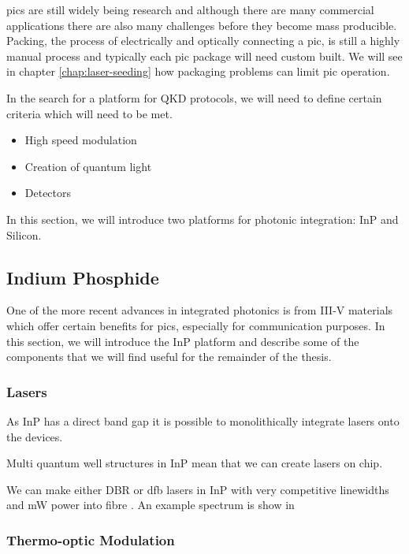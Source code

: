 \Acp{pic} are still widely being research and although there are many commercial applications there are also many challenges before they become mass producible. Packing, the process of electrically and optically connecting a \ac{pic}, is still a highly manual process and typically each \ac{pic} package will need custom built. We will see in chapter \ref{chap:laser-seeding} how packaging problems can limit \ac{pic} operation.

In the search for a platform for \ac{QKD} protocols, we will need to define certain criteria which will need to be met.

\begin{itemize}
	\item High speed modulation
	\item Creation of quantum light
	\item Detectors
\end{itemize}

In this section, we will introduce two platforms for photonic integration: \Ac{InP} and Silicon.

\subsection{Indium Phosphide}

One of the more recent advances in integrated photonics is from III-V materials which offer certain benefits for \acp{pic}, especially for communication purposes. In this section, we will introduce the \acl{InP} platform and describe some of the components that we will find useful for the remainder of the thesis.

\subsubsection*{Lasers}

As \ac{InP} has a direct band gap it is possible to monolithically integrate lasers onto the devices. 

Multi quantum well structures in \ac{InP} mean that we can create lasers on chip.

We can make either \ac{DBR} or \ac{dfb} lasers in \ac{InP} with very competitive linewidths and mW power into fibre \cite{jeppix}. An example spectrum is show in 

\subsubsection*{Thermo-optic Modulation}

